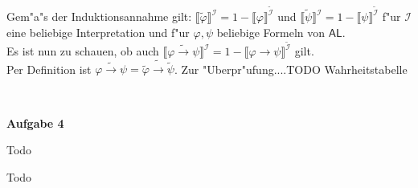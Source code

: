 \documentclass[a4paper,10pt]{article}
\begin{document}
\begin{compactenum} [(a)]
		Gem"a"s der Induktionsannahme gilt: $\llbracket \tilde{\varphi} \rrbracket^\mathcal{I} = 1 - \llbracket \varphi \rrbracket^{\tilde{\mathcal{I}}}$ und $\llbracket \tilde{\psi} \rrbracket^\mathcal{I} = 1 - \llbracket \psi \rrbracket^{\tilde{\mathcal{I}}}$ f"ur $\mathcal{I}$ eine beliebige Interpretation und f"ur $\varphi, \psi$ beliebige Formeln von $\mathsf{AL}$.\\
		Es ist nun zu schauen, ob auch $\llbracket \widetilde{\varphi \rightarrow \psi} \rrbracket^\mathcal{I} = 1 - \llbracket \varphi \rightarrow \psi \rrbracket^{\tilde{\mathcal{I}}}$ gilt.\\
		Per Definition ist $\widetilde{\varphi \rightarrow \psi} = \tilde{\varphi} \tilde{\rightarrow} \tilde{\psi}$. Zur "Uberpr"ufung....TODO Wahrheitstabelle
	\end{compactenum}\
	
	\textbf{Aufgabe 4}
	\begin{compactenum} [(a)]
		\item Todo
		
		\item Todo
	\end{compactenum}
\end{document}
